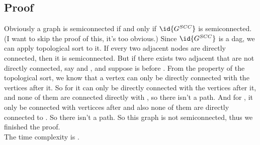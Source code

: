 \documentclass[a4paper]{article}
\begin{document}
\subsection*{Proof}
Obviously a graph  is semiconnected if and only if $\id{G^{SCC}}$ is semiconnected. (I want to skip the proof of this, it's too obvious.)
Since $\id{G^{SCC}}$ is a dag, we can apply topological sort to it. If every two adjacent nodes are directly connected, then it is semiconnected. But if
there exists two adjacent that are not directly connected, say  and , and suppose  is before . From the property of the topological sort,
we know that a vertex can only be directly connected with the vertices after it. So for  it can only be directly connected with the vertices after it, and none of them are connected directly with
, so there isn't a  path. And for , it only be connected with verticces after  and also none of them are directly connected to . So there isn't a  path. So this graph is
not semiconnected, thus we finished the proof.\\
The time complexity is .
\end{document}
